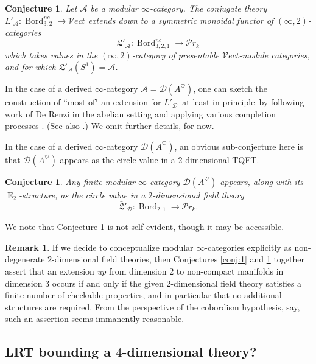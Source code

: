 \documentclass[reqno]{amsart}
\newtheorem{conjecture}[lemma]{Conjecture}
\theoremstyle{definition}
\newtheorem{remark}[lemma]{Remark}
\newcommand{\mfk}[1]{\mathfrak{#1}}
\newcommand{\msc}[1]{\mathscr{#1}}
\newcommand{\opn}[1]{\operatorname{#1}}
\newcommand{\Vect}{\msc{V}\!ect}
\DeclareMathOperator{\Bord}{Bord}
\renewcommand{\1}{\mathbf{1}}
\begin{document}
\begin{conjecture}\label{conj:3}
Let $\msc{A}$ be a modular $\infty$-category. The conjugate theory $L'_{\msc{A}}:\Bord^{nc}_{3,2}\to \Vect$ extends down to a symmetric monoidal functor of $(\infty,2)$-categories
\[
\mfk{L}'_{\msc{A}}:\Bord^{nc}_{3,2,1}\to \msc{P}\!r_{k}
\]
which takes values in the $(\infty,2)$-category of presentable $\Vect$-module categories, and for which $\mfk{L}'_{\msc{A}}(S^1)=\msc{A}$.
\end{conjecture}

In the case of a derived $\infty$-category $\msc{A}=\msc{D}(A^{\heartsuit})$, one can sketch the construction of ``most of" an extension for $L'_{\msc{D}}$--at least in principle--by following work of De Renzi in the abelian setting \cite{derenzi21} and applying various completion processes \cite[Proposition 5.5.8.22]{lurie09} \cite[Corollary 1.4.4.5]{ha}.  (See also \cite{bartlettetal,lagiotis}.) We omit further details, for now.

In the case of a derived $\infty$-category $\msc{D}(A^{\heartsuit})$, an obvious sub-conjecture here is that $\msc{D}(A^{\heartsuit})$ appears as the circle value in a $2$-dimensional TQFT.

\begin{conjecture}\label{conj:3.5}
Any finite modular $\infty$-category $\msc{D}(A^{\heartsuit})$ appears, along with its $\opn{E}_2$-structure, as the circle value in a $2$-dimensional field theory
\[
\bar{\mfk{L}}'_{\msc{D}}:\Bord_{2,1}\to \msc{P}\!r_k.
\]
\end{conjecture}

We note that Conjecture \ref{conj:3.5} is not self-evident, though it may be accessible.

\begin{remark}
If we decide to conceptualize modular $\infty$-categories explicitly as non-degenerate $2$-dimensional field theories, then Conjectures \ref{conj:1} and \ref{conj:3} together assert that an extension \emph{up} from dimension $2$ to non-compact manifolds in dimension $3$ occurs if and only if the given $2$-dimensional field theory satisfies a finite number of checkable properties, and in particular that no additional structures are required. From the perspective of the cobordism hypothesis, say, such an assertion seems immanently reasonable.
\end{remark}

\subsection{LRT bounding a $4$-dimensional theory?}
\end{document}
